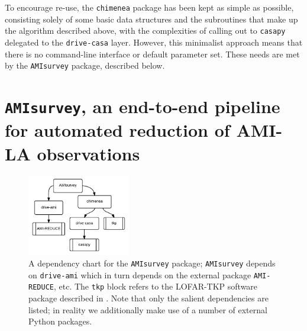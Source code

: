 \documentclass[5p,authoryear]{elsarticle}
\begin{document}
To encourage re-use, the \texttt{chimenea} package has been kept as simple as possible, consisting solely of some basic data structures and the subroutines that make up the algorithm described above, with the complexities of calling out to \texttt{casapy} delegated to the \texttt{drive-casa} layer. 
However, this minimalist approach means that there is no command-line interface or default parameter set. 
These needs are met by the \texttt{AMIsurvey} package, described below.


% 
% 
\section{\texttt{AMIsurvey}, an end-to-end pipeline for automated reduction of AMI-LA observations}
\label{sec:amisurvey} 
\begin{figure}
\begin{center}  
  \includegraphics[width=0.4\textwidth]{../figures/amisurvey-deps}
  \caption[Dependency chart for the \texttt{AMIsurvey} package.]{%
A dependency chart for the \texttt{AMIsurvey} package; \texttt{AMIsurvey} depends on \texttt{drive-ami}  which in turn depends on the external package \texttt{AMI-REDUCE}, etc.
The \texttt{tkp} block refers to the LOFAR-TKP software package \citep{Trap2014} described in \cite{Swinbank2015}.
Note that only the salient dependencies are listed; in reality we additionally make use of a 
number of external Python packages.
\label{fig:amisurvey-deps}
} 
\end{center} 
\end{figure}
\end{document}
